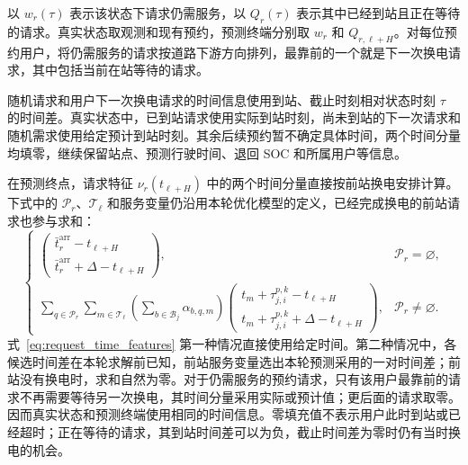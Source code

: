 以 $w_r(\tau)$ 表示该状态下请求仍需服务，以 $Q_r(\tau)$ 表示其中已经到站且正在等待的请求。真实状态取观测和现有预约，预测终端分别取 $w_r$ 和 $Q_{r,\ell+H}$。对每位预约用户，将仍需服务的请求按道路下游方向排列，最靠前的一个就是下一次换电请求，其中包括当前在站等待的请求。

随机请求和用户下一次换电请求的时间信息使用到站、截止时刻相对状态时刻 $\tau$ 的时间差。真实状态中，已到站请求使用实际到站时刻，尚未到站的下一次请求和随机需求使用给定预计到站时刻。其余后续预约暂不确定具体时间，两个时间分量均填零，继续保留站点、预测行驶时间、退回 SOC 和所属用户等信息。

在预测终点，请求特征 $\nu_r(t_{\ell+H})$ 中的两个时间分量直接按前站换电安排计算。下式中的 $\mathcal P_r$、$\mathcal T_\ell$ 和服务变量仍沿用本轮优化模型的定义，已经完成换电的前站请求也参与求和：
\begin{equation}
\begin{cases}
\begin{pmatrix}
\bar t_r^{\mathrm{arr}}-t_{\ell+H}\\
\bar t_r^{\mathrm{arr}}+\Delta-t_{\ell+H}
\end{pmatrix},
&\mathcal P_r=\varnothing,\\[2mm]
\displaystyle
\sum_{q\in\mathcal P_r}\sum_{m\in\mathcal T_\ell}
\left(\sum_{b\in\mathcal B_j}\alpha_{b,q,m}\right)
\begin{pmatrix}
t_m+\tau_{j,i}^{p,k}-t_{\ell+H}\\
t_m+\tau_{j,i}^{p,k}+\Delta-t_{\ell+H}
\end{pmatrix},
&\mathcal P_r\ne\varnothing.
\end{cases}
\label{eq:request_time_features}
\end{equation}
式~\eqref{eq:request_time_features} 第一种情况直接使用给定时间。第二种情况中，各候选时间差在本轮求解前已知，前站服务变量选出本轮预测采用的一对时间差；前站没有换电时，求和自然为零。对于仍需服务的预约请求，只有该用户最靠前的请求不再需要等待另一次换电，其时间分量采用实际或预计值；更后面的请求取零。因而真实状态和预测终端使用相同的时间信息。零填充值不表示用户此时到站或已经超时；正在等待的请求，其到站时间差可以为负，截止时间差为零时仍有当时换电的机会。

